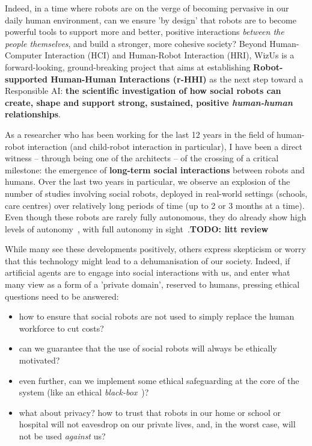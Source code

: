 \documentclass[11pt]{report}
\newcommand{\project}{WizUs\xspace}
\newcommand{\TODO}[1]{{\color{red}\textbf{TODO: #1}}}
\begin{document}
Indeed, in a time where robots are on the verge of becoming pervasive in our
daily human environment, can we ensure 'by design' that robots are to become
powerful tools to support more and better, positive interactions \emph{between
the people themselves}, and build a stronger, more cohesive society? Beyond
Human-Computer Interaction (HCI) and Human-Robot Interaction (HRI), \project is
a forward-looking, ground-breaking project that aims at establishing
\textbf{Robot-supported Human-Human Interactions (r-HHI)} as the next step
toward a Responsible AI: \textbf{the scientific investigation of how social
robots can create, shape and support strong, sustained, positive
\emph{human-human} relationships}.

As a researcher who has been working for the last 12 years in the field of
human-robot interaction (and child-robot interaction in particular), I have been
a direct witness -- through being one of the architects -- of the crossing of a
critical milestone: the emergence of \textbf{long-term social interactions}
between robots and humans. Over the last two
years in particular, we observe an explosion of the number of studies involving
social robots, deployed in real-world settings (schools, care centres) over
relatively long periods of time (up to 2 or 3 months at a time). Even though
these robots are rarely fully autonomous, they do already show high levels of
autonomy~\cite{emmanuel}, with full autonomy in sight~\cite{strands}.\TODO{litt review}

While many see these developments positively,
others express skepticism or worry that this technology might lead to a
dehumanisation of our society. Indeed, if artificial agents are to engage into
social interactions with us, and enter what many view as a form of a 'private
domain', reserved to humans, pressing ethical questions need to be answered:

\begin{itemize}
    \item how to ensure that social robots are not used to simply replace the human
        workforce to cut costs?
    \item can we guarantee that the use of social robots will always be ethically motivated?
    \item even further, can we implement some ethical safeguarding at the core
        of the system (like an ethical \emph{black-box}~\cite{winfield2017case})?
    \item what about privacy? how to trust that robots in our home or school or
        hospital will not eavesdrop on our private lives, and, in the worst
        case, will not be used \emph{against} us?
\end{itemize}
\end{document}
